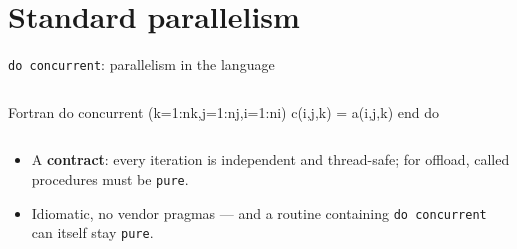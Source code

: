 \documentclass[aspectratio=169]{beamer}
\begin{document}
\section{Standard parallelism}

\begin{frame}[fragile]{\texttt{do concurrent}: parallelism in the language}
  \begin{columns}[T,onlytextwidth]
      \begin{cookiecode}[title=Standard Fortran]{Fortran}
do concurrent (k=1:nk,j=1:nj,i=1:ni)
  c(i,j,k) = a(i,j,k)
end do
      \end{cookiecode}
  \end{columns}
  \vspace{.2em}
  {\footnotesize
  \begin{itemize}\setlength\itemsep{1pt}
    \item A \textbf{contract}: every iteration is independent and thread-safe; for offload, called procedures must be \texttt{pure}.
    \item Idiomatic, no vendor pragmas --- and a routine containing \texttt{do concurrent} can itself stay \texttt{pure}.
  \end{itemize}}
\end{frame}
\end{document}
